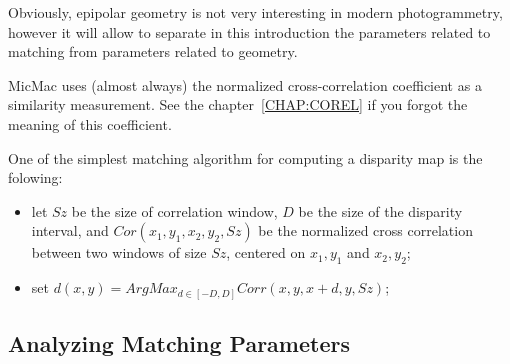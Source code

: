 Obviously, epipolar geometry is not very interesting in modern
photogrammetry, however it will allow to separate in this introduction the
parameters related to  matching  from parameters related to geometry.



MicMac uses (almost always) the normalized cross-correlation coefficient
as a similarity measurement. See the chapter~\ref{CHAP:COREL} if you
forgot the meaning of this coefficient.

One of the simplest matching algorithm for computing a disparity map is
the folowing:

\begin{itemize}
    \item let $Sz$ be the size of correlation window, $D$ be the size of the
          disparity interval, and $Cor(x_1,y_1,x_2,y_2,Sz)$ be the normalized
          cross correlation between two windows of size $Sz$, centered on $x_1,y_1$
           and $x_2,y_2$;

    \item set $d(x,y) = ArgMax_{d\in[-D,D]} Corr(x,y,x+d,y,Sz)$;
\end{itemize}


\subsection{Analyzing Matching Parameters}


